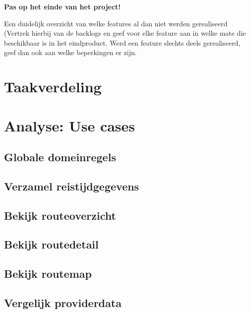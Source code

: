 \documentclass[a4paper]{article}
\begin{document}
\textbf{Pas op het einde van het project!}

Een duidelijk overzicht van welke features al dan
niet werden gerealiseerd (Vertrek hierbij van de backlogs en
geef voor elke feature aan in welke mate die beschikbaar is in
het eindproduct. Werd een feature slechts deels gerealiseerd,
geef dan ook aan welke beperkingen er zijn.

\newpage

\section{Taakverdeling}



\newpage

\section{Analyse: Use cases}

\subsection{Globale domeinregels}


\newpage

\subsection{Verzamel reistijdgegevens}
\newpage

\subsection{Bekijk routeoverzicht}
\newpage

\subsection{Bekijk routedetail}
\newpage

\subsection{Bekijk routemap}
\newpage

\subsection{Vergelijk providerdata}
\newpage
\end{document}
